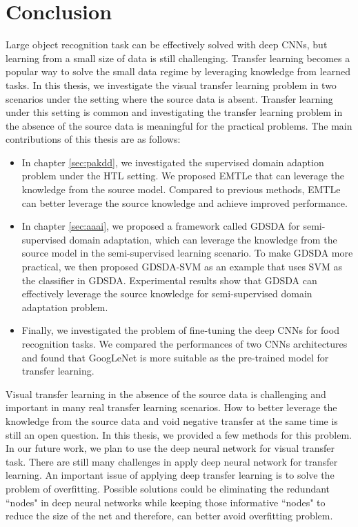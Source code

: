 \chapter{Conclusion}
Large object recognition task can be effectively solved with deep CNNs, but learning from a small size of data is still challenging. Transfer learning becomes a popular way to solve the small data regime by leveraging knowledge from learned tasks. 
In this thesis, we investigate the visual transfer learning problem in two scenarios under the setting where the source data is absent. Transfer learning under this setting is common and investigating the transfer learning problem in the absence of the source data is meaningful for the practical problems. The main contributions of this thesis are as follows:
\begin{itemize}
	\item In chapter \ref{sec:pakdd}, we investigated the supervised domain adaption problem under the HTL setting. We proposed EMTLe that can leverage the knowledge from the source model. Compared to previous methods, EMTLe can better leverage the source knowledge and achieve improved performance.
	\item In chapter \ref{sec:aaai}, we proposed a framework called GDSDA for semi-supervised domain adaptation, which can leverage the knowledge from the source model in the semi-supervised learning scenario. To make GDSDA more practical, we then proposed GDSDA-SVM as an example that uses SVM as the classifier in GDSDA. Experimental results show that GDSDA can effectively leverage the source knowledge for semi-supervised domain adaptation problem. 
	\item Finally, we investigated the problem of fine-tuning the deep CNNs for food recognition tasks. We compared the performances of two CNNs architectures and found that GoogLeNet is more suitable as the pre-trained model for transfer learning.
\end{itemize}

Visual transfer learning in the absence of the source data is challenging and important in many real transfer learning scenarios. How to better leverage the knowledge from the source data and void negative transfer at the same time is still an open question. In this thesis, we provided a few methods for this problem. In our future work, we plan to use the deep neural network for visual transfer task. There are still many challenges in apply deep neural network for transfer learning. An important issue of applying deep transfer learning is to solve the problem of overfitting. Possible solutions could be eliminating the redundant ``nodes" in deep neural networks while keeping those informative ``nodes" to reduce the size of the net and therefore, can better avoid overfitting problem.
